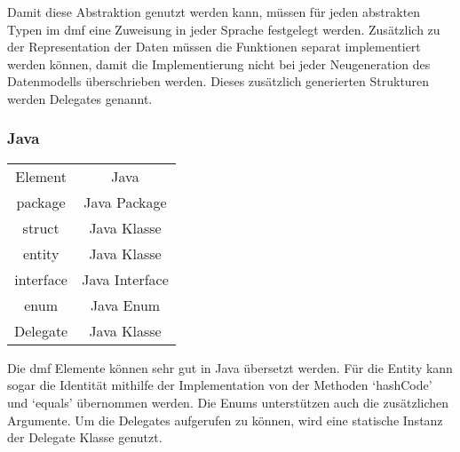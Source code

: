 \documentclass[./einleitung.tex]{subfiles}
\begin{document}
    Damit diese Abstraktion genutzt werden kann, müssen für jeden abstrakten Typen im \acrshort{dmf} eine Zuweisung in jeder Sprache festgelegt werden.
    Zusätzlich zu der Representation der Daten müssen die Funktionen separat implementiert werden können, damit die Implementierung nicht bei jeder Neugeneration des Datenmodells überschrieben werden.
    Dieses zusätzlich generierten Strukturen werden Delegates genannt.

    \subsubsection{Java}
    \begin{center}
        \begin{tabular}{| c || c |}
            \hline
            Element   & Java           \\
            \hhline{|=||=|}
            package   & Java Package   \\
            \hline
            struct    & Java Klasse    \\
            \hline
            entity    & Java Klasse    \\
            \hline
            interface & Java Interface \\
            \hline
            enum      & Java Enum      \\
            \hline
            Delegate  & Java Klasse    \\
            \hline
        \end{tabular}
    \end{center}
    Die \acrshort{dmf} Elemente können sehr gut in Java übersetzt werden.
    Für die Entity kann sogar die Identität mithilfe der Implementation von der Methoden `hashCode' und `equals' übernommen werden.
    Die Enums unterstützen auch die zusätzlichen Argumente.
    Um die Delegates aufgerufen zu können, wird eine statische Instanz der Delegate Klasse genutzt.
\end{document}
